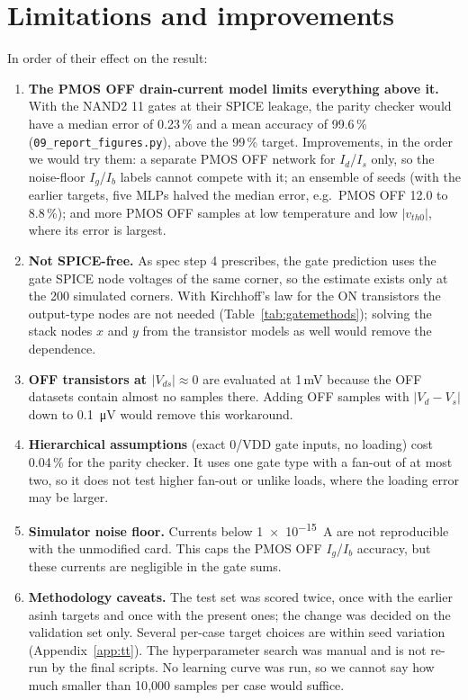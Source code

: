 \documentclass[11pt,a4paper]{article}
\begin{document}
\section{Limitations and improvements}\label{sec:limits}
In order of their effect on the result:
\begin{enumerate}[leftmargin=*]
  \item \textbf{The PMOS OFF drain-current model limits everything above it.} With the NAND2 11 gates
        at their SPICE leakage, the parity checker would have a median error of 0.23\,\% and a mean
        accuracy of 99.6\,\% (\texttt{09\_report\_figures.py}), above the 99\,\% target. Improvements, in
        the order we would try them: a separate PMOS OFF network for $I_d$/$I_s$ only, so the noise-floor
        $I_g$/$I_b$ labels cannot compete with it; an ensemble of seeds (with the earlier targets, five
        MLPs halved the median error, e.g.\ PMOS OFF 12.0 to 8.8\,\%); and more PMOS OFF samples at low
        temperature and low $|v_{th0}|$, where its error is largest.
  \item \textbf{Not SPICE-free.} As spec step 4 prescribes, the gate prediction uses the gate SPICE node
        voltages of the same corner, so the estimate exists only at the 200 simulated corners. With
        Kirchhoff's law for the ON transistors the output-type nodes are not needed (Table~\ref{tab:gatemethods});
        solving the stack nodes $x$ and $y$ from the transistor models as well would remove the dependence.
  \item \textbf{OFF transistors at $|V_{ds}| \approx 0$} are evaluated at 1\,mV because the OFF datasets
        contain almost no samples there. Adding OFF samples with $|V_d - V_s|$ down to \SI{0.1}{\micro V}
        would remove this workaround.
  \item \textbf{Hierarchical assumptions} (exact 0/VDD gate inputs, no loading) cost 0.04\,\% for the
        parity checker. It uses one gate type with a fan-out of at most two, so it does not test higher
        fan-out or unlike loads, where the loading error may be larger.
  \item \textbf{Simulator noise floor.} Currents below \SI{1e-15}{A} are not reproducible with the
        unmodified card. This caps the PMOS OFF $I_g$/$I_b$ accuracy, but these currents are negligible
        in the gate sums.
  \item \textbf{Methodology caveats.} The test set was scored twice, once with the earlier asinh
        targets and once with the present ones; the change was decided on the validation set only.
        Several per-case target choices are within seed variation (Appendix~\ref{app:tt}). The
        hyperparameter search was manual and is not re-run by the final scripts. No learning curve was
        run, so we cannot say how much smaller than 10{,}000 samples per case would suffice.
\end{enumerate}
\end{document}
